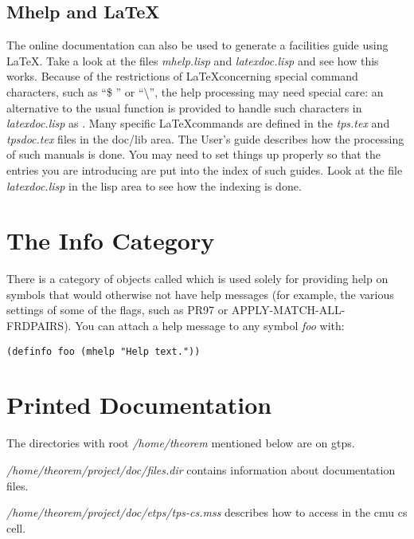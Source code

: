 \subsection{Mhelp and \LaTeX }
The online documentation can also be used to generate a facilities guide using \LaTeX. 
Take a look at the files {\it mhelp.lisp} and {\it latexdoc.lisp} and see
how this works. Because of the restrictions of \LaTeX concerning special command characters, such as
``\$ '' or ``\textbackslash '', the help processing may need special care: an alternative to the usual
{\tt {}} function is provided to handle such characters in {\it latexdoc.lisp} as
{\tt {}}. Many specific \LaTeX commands are defined in the {\it tps.tex} and
{\it tpsdoc.tex} files in the doc/lib area. The User's guide describes how the processing of such manuals
is done.
You may need to set things up properly so that the entries you
are introducing are put into the index of such guides.  Look at the
file {\it latexdoc.lisp} in the lisp area to see how the indexing is done.

\section{The Info Category}

There is a category of objects called  which is used solely for providing
help on symbols that would otherwise not have help messages (for example, the various settings
of some of the flags, such as PR97 or APPLY-MATCH-ALL-FRDPAIRS). You can attach a help message
to any symbol {\it foo} with:

\begin{verbatim}
(definfo foo (mhelp "Help text."))
\end{verbatim}

\section{Printed Documentation}

The directories with root {\it /home/theorem} mentioned below are
on gtps.

{\it /home/theorem/project/doc/files.dir} contains information about
\TPS documentation files.

{\it /home/theorem/project/doc/etps/tps-cs.mss} describes how to
access \TPS in the cmu cs cell.

